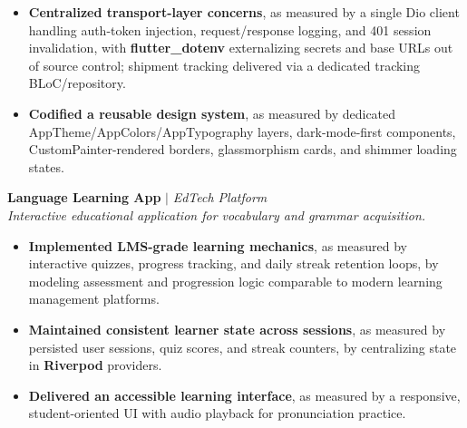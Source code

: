 \documentclass[10pt,letterpaper]{article}
\newenvironment{highlights}{
  \begin{itemize}[topsep=2pt,parsep=1pt,partopsep=0pt,itemsep=0pt,leftmargin=10pt]
}{\end{itemize}}
\begin{document}
\begin{highlights}
  \item \textbf{Centralized transport-layer concerns}, as measured by a single Dio client handling auth-token injection, request/response logging, and 401 session invalidation, with \textbf{flutter\_dotenv} externalizing secrets and base URLs out of source control; shipment tracking delivered via a dedicated tracking BLoC/repository.
  \item \textbf{Codified a reusable design system}, as measured by dedicated AppTheme/AppColors/AppTypography layers, dark-mode-first components, CustomPainter-rendered borders, glassmorphism cards, and shimmer loading states.
\end{highlights}

\vspace{3pt}

\textbf{Language Learning App} $|$ \textit{EdTech Platform}
\hfill \href{https://github.com/Yeasin84/Language_Learning_APP.git}{\textcolor{myblue}{\faGithub}}\\
\textit{Interactive educational application for vocabulary and grammar acquisition.}
\begin{highlights}
  \item \textbf{Implemented LMS-grade learning mechanics}, as measured by interactive quizzes, progress tracking, and daily streak retention loops, by modeling assessment and progression logic comparable to modern learning management platforms.
  \item \textbf{Maintained consistent learner state across sessions}, as measured by persisted user sessions, quiz scores, and streak counters, by centralizing state in \textbf{Riverpod} providers.
  \item \textbf{Delivered an accessible learning interface}, as measured by a responsive, student-oriented UI with audio playback for pronunciation practice.
\end{highlights}

\vspace{3pt}
\end{document}
